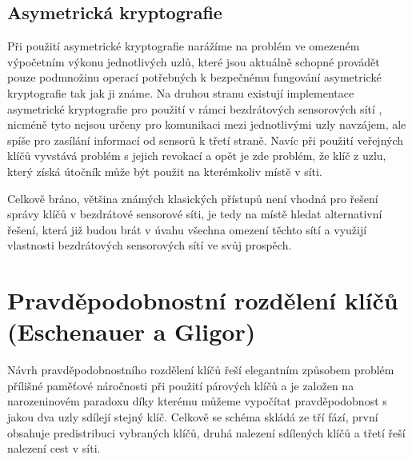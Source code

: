 \documentclass[11pt,final,twoside]{fithesis2}
\begin{document}
\subsection{Asymetrická kryptografie} Při použití asymetrické kryptografie narážíme na problém ve omezeném výpočetním výkonu jednotlivých uzlů, 
které jsou aktuálně schopné provádět pouze podmnožinu operací potřebných k bezpečnému fungování asymetrické kryptografie tak jak ji známe.
Na druhou stranu existují implementace asymetrické kryptografie pro použití v rámci bezdrátových sensorových sítí \cite{Watro2004}, nicméně 
tyto nejsou určeny pro komunikaci mezi jednotlivými uzly navzájem, ale spíše pro zasílání informací od sensorů k třetí straně. 
Navíc při použití veřejných klíčů vyvstává problém s jejich revokací a opět je zde problém, že klíč z uzlu, který získá útočník může být použit 
na kterémkoliv místě v síti.

Celkově bráno, většina známých klasických přístupů není vhodná pro řešení správy klíčů v bezdrátové sensorové síti, je tedy na místě hledat alternativní řešení,
která již budou brát v úvahu všechna omezení těchto sítí a využijí vlastnosti bezdrátových sensorových sítí ve svůj prospěch.

\section{Pravděpodobnostní rozdělení klíčů (Eschenauer a Gligor)} \label{sec:Eschenauer}
Návrh pravděpodobnostního rozdělení klíčů \cite{Eschenauer2002} řeší elegantním způsobem problém přílišné paměťové náročnosti při použití párových klíčů a je 
založen na narozeninovém paradoxu díky kterému můžeme vypočítat pravděpodobnost s jakou dva uzly sdílejí stejný klíč. 
Celkově se schéma skládá ze tří fází, první obsahuje predistribuci vybraných klíčů, druhá nalezení sdílených klíčů a třetí řeší nalezení cest v síti.
\end{document}
